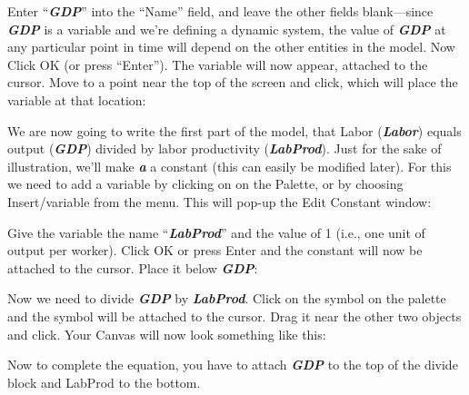 \begin{center}
\end{center}

Enter ``{\em\bf GDP}'' into the ``Name'' field, and leave the other
fields blank---since {\em\bf GDP} is a variable and we're defining a
dynamic system, the value of {\em\bf GDP} at any particular point in
time will depend on the other entities in the model. Now Click OK (or
press ``Enter''). The variable will now appear, attached to the
cursor. Move to a point near the top of the screen and click, which
will place the variable at that location:

\begin{center}
\end{center}


We are now going to write the first part of the model, that Labor
({\em\bf Labor}) equals output ({\em\bf GDP}) divided by labor
productivity ({\em\bf LabProd}). Just for the sake of illustration,
we'll make {\em\bf a} a constant (this can easily be modified
later). For this we need to add a variable by clicking on  on the
Palette, or by choosing Insert/variable from the menu. This will
pop-up the Edit Constant window: 

\begin{center}
\end{center}

Give the variable the name ``{\em\bf LabProd}'' and the value of 1
(i.e., one unit of output per worker). Click OK or press Enter and the
constant   will now be attached to the
cursor. Place it below {\em\bf GDP}: 

\begin{center}
\end{center}

Now we need to divide {\em\bf GDP} by {\em\bf LabProd}. Click on the
 symbol on the palette and the symbol will
be attached to the cursor. Drag it near the other two objects and
click. Your Canvas will now look something like this: 

\begin{center}
\end{center}

Now to complete the equation, you have to attach {\em\bf GDP}  to the top of the
divide block and LabProd to the bottom.

